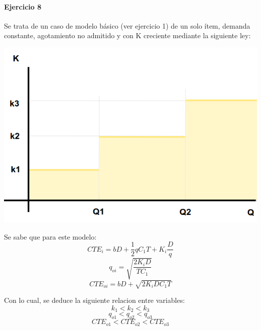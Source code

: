 \documentclass[a4paper,10pt]{article}
\begin{document}
\paragraph{Ejercicio 8}
Se trata de un caso de modelo básico (ver ejercicio 1) de un solo ítem, demanda constante, agotamiento no admitido y con K creciente mediante la siguiente ley: 
\begin{center}
  \includegraphics[scale=0.4,keepaspectratio=true]{img/8/8_QvsK.png} 
\end{center}

Se sabe que para este modelo:
  \begin{equation}\label{8_CTE}CTE_i = bD + \frac{1}{2}qC_1T + K_i \frac{D}{q} \end{equation}
  $$ q_{oi} = \sqrt{ \frac{2K_iD}{TC_1}} $$
  $$ CTE_{oi} = bD + \sqrt{ 2K_iDC_1T }$$

Con lo cual, se deduce la siguiente relacion entre variables:
 $$ k_1 < k_2 < k_3 $$
 $$ q_{o1} < q_{o2} < q_{o3}$$
 $$ CTE_{o1} < CTE_{o2} < CTE_{o3} $$
 
\end{document}
